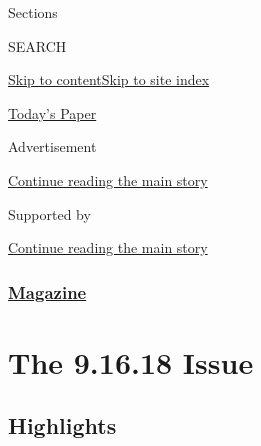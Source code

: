Sections

SEARCH

\protect\hyperlink{site-content}{Skip to
content}\protect\hyperlink{site-index}{Skip to site index}

\href{https://myaccount.nytimes3xbfgragh.onion/auth/login?response_type=cookie\&client_id=vi}{}

\href{https://www.nytimes3xbfgragh.onion/section/todayspaper}{Today's
Paper}

Advertisement

\protect\hyperlink{after-top}{Continue reading the main story}

Supported by

\protect\hyperlink{after-sponsor}{Continue reading the main story}

\hypertarget{magazine}{%
\subsubsection{\texorpdfstring{\href{/section/magazine}{Magazine}}{Magazine}}\label{magazine}}

\hypertarget{the-91618-issue}{%
\section{The 9.16.18 Issue}\label{the-91618-issue}}

\hypertarget{highlights}{%
\subsection{Highlights}\label{highlights}}

